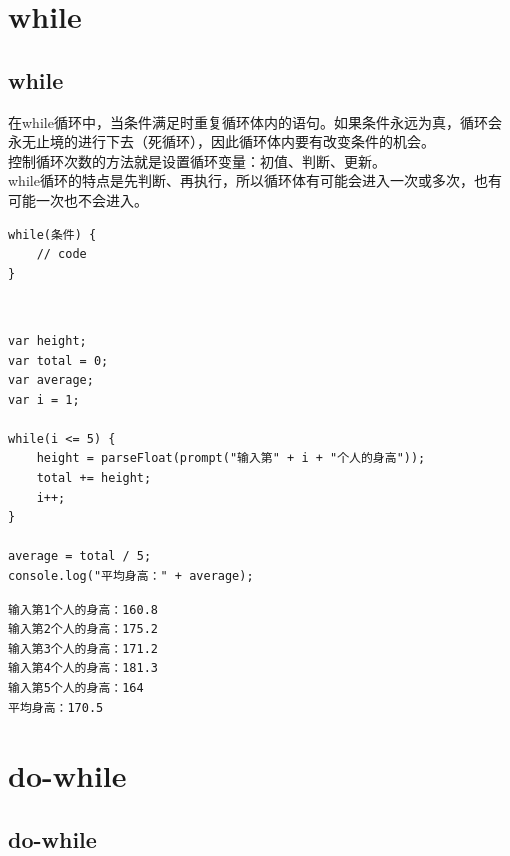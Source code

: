 \newpage

\section{while}

\subsection{while}

在while循环中，当条件满足时重复循环体内的语句。如果条件永远为真，循环会永无止境的进行下去（死循环），因此循环体内要有改变条件的机会。\\

控制循环次数的方法就是设置循环变量：初值、判断、更新。\\

while循环的特点是先判断、再执行，所以循环体有可能会进入一次或多次，也有可能一次也不会进入。\\

\begin{lstlisting}[style=htmlcssjs]
while(条件) {
    // code
}
\end{lstlisting}

\vspace{0.5cm}

\\

\begin{lstlisting}[style=htmlcssjs]
var height;
var total = 0;
var average;
var i = 1;

while(i <= 5) {
    height = parseFloat(prompt("输入第" + i + "个人的身高"));
    total += height;
    i++;
}

average = total / 5;
console.log("平均身高：" + average);
\end{lstlisting}

\begin{tcolorbox}
	\begin{verbatim}
输入第1个人的身高：160.8
输入第2个人的身高：175.2
输入第3个人的身高：171.2
输入第4个人的身高：181.3
输入第5个人的身高：164
平均身高：170.5
	\end{verbatim}
\end{tcolorbox}

\newpage

\section{do-while}

\subsection{do-while}

